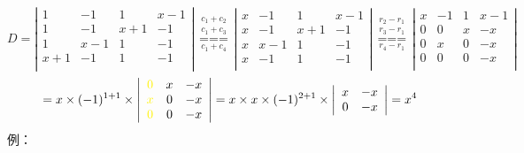 $$
D=\left|
\begin{array}{cccc}
1   & -1  & 1   & x-1 \\
1   & -1  & x+1 & -1  \\    
1   & x-1 & 1   & -1  \\    
x+1 & -1  & 1   & -1  \\
\end{array}\right|
\underset{{{c}_{1}}+{{c}_{4}}}{\overset{
\begin{smallmatrix} 
{{c}_{1}}+{{c}_{2}} \\ 
{{c}_{1}}+{{c}_{3}} 
\end{smallmatrix}}{\mathop{===}}}\left| 
\begin{matrix}
    x & -1 & 1 & x-1  \\
    x & -1 & x+1 & -1  \\
    x & x-1 & 1 & -1  \\
    x & -1 & 1 & -1  \\
\end{matrix} \right|
\underset{{{r}_{4}}-{{r}_{1}}}{\overset{
\begin{smallmatrix} 
{{r}_{2}}-{{r}_{1}} \\ 
{{r}_{3}}-{{r}_{1}} 
\end{smallmatrix}}{\mathop{===}}}
\left| 
\begin{matrix}
x & -1 & 1 & x-1  \\
0 & 0 & x & -x  \\
0 & x & 0 & -x  \\
0 & 0 & 0 & -x  \\
\end{matrix} \right|
$$$$
=x\times (-1)^{1+1} \times \left|
\begin{array}{ccc}
{\color{yellow} 0} & x & -x \\
{\color{yellow} x} & 0 & -x \\    
{\color{yellow} 0} & 0 & -x \\
\end{array}\right|=x\times x \times (-1)^{2+1}\times\left|
\begin{array}{cc}
x & -x \\
0 & -x \\    
\end{array}\right|=x^{4}
$$
{\color{blue} 例：}
